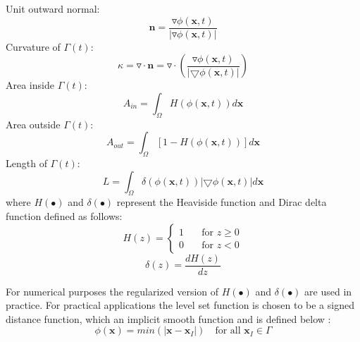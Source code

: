 \documentclass[10pt,letterpaper, onecolumn]{article}
\begin{document}
\noindent Unit outward normal:
%
\begin{equation}
\bm{n} = \frac{\triangledown \phi(\bm{x},t)}{\left\vert \triangledown \phi(\bm{x},t) \right\vert}
\label{eqn:3.2}
\end{equation}
%
Curvature of $\Gamma(t)$:
%
\begin{equation}
\kappa = \triangledown \cdot \bm{n} = \triangledown \cdot \left(  \frac{\triangledown \phi(\bm{x},t)}{\left\vert \bigtriangledown \phi(\bm{x},t) \right\vert} \right)
\end{equation}
%
Area inside $\Gamma(t)$:
%
\begin{equation}
A_{in} = \int_{\Omega} H(\phi(\bm{x},t)) d\bm{x}
\end{equation}
%
Area outside $\Gamma(t)$:
%
\begin{equation}
A_{out} = \int_{\Omega} [1 - H(\phi(\bm{x},t))] d\bm{x}
\end{equation}
%
Length of $\Gamma(t)$:
%
\begin{equation}
L = \int_{\Omega} \delta(\phi(\bm{x},t))
 \left\vert \bigtriangledown \phi(\bm{x},t) \right\vert  d\bm{x}
\end{equation}
%
where $H(\bullet)$ and $\delta(\bullet)$ represent the Heaviside function and Dirac delta 
function defined as follows:
%
\begin{equation}
H(z)=
\begin{cases}
1 \quad       &\text{for } z\geq0   \\
0 \quad       &\text{for } z <0
\end{cases} 
\end{equation}
%
%
\begin{equation}
\delta(z)  = \frac{dH(z)}{dz}
\end{equation}
%

For numerical purposes the regularized version of $H(\bullet)$ and $\delta(\bullet)$ are used in practice. For practical applications the level set function is chosen to be a signed distance function, which an implicit smooth function and is defined below \cite{osherbook2003level}:
%
\begin{equation}
\phi(\bm{x}) = min(\vert \bm{x} - \bm{x}_I \vert)  \quad \text{for all }  \bm{x}_I  \in \Gamma
\end{equation}
%
\end{document}
